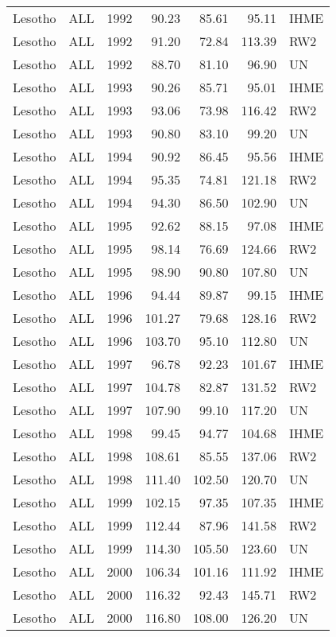 \begin{longtable}{lllrrrl}
  Lesotho & ALL & 1992 & 90.23 & 85.61 & 95.11 & IHME \\ 
  Lesotho & ALL & 1992 & 91.20 & 72.84 & 113.39 & RW2 \\ 
  Lesotho & ALL & 1992 & 88.70 & 81.10 & 96.90 & UN \\ 
  Lesotho & ALL & 1993 & 90.26 & 85.71 & 95.01 & IHME \\ 
  Lesotho & ALL & 1993 & 93.06 & 73.98 & 116.42 & RW2 \\ 
  Lesotho & ALL & 1993 & 90.80 & 83.10 & 99.20 & UN \\ 
  Lesotho & ALL & 1994 & 90.92 & 86.45 & 95.56 & IHME \\ 
  Lesotho & ALL & 1994 & 95.35 & 74.81 & 121.18 & RW2 \\ 
  Lesotho & ALL & 1994 & 94.30 & 86.50 & 102.90 & UN \\ 
  Lesotho & ALL & 1995 & 92.62 & 88.15 & 97.08 & IHME \\ 
  Lesotho & ALL & 1995 & 98.14 & 76.69 & 124.66 & RW2 \\ 
  Lesotho & ALL & 1995 & 98.90 & 90.80 & 107.80 & UN \\ 
  Lesotho & ALL & 1996 & 94.44 & 89.87 & 99.15 & IHME \\ 
  Lesotho & ALL & 1996 & 101.27 & 79.68 & 128.16 & RW2 \\ 
  Lesotho & ALL & 1996 & 103.70 & 95.10 & 112.80 & UN \\ 
  Lesotho & ALL & 1997 & 96.78 & 92.23 & 101.67 & IHME \\ 
  Lesotho & ALL & 1997 & 104.78 & 82.87 & 131.52 & RW2 \\ 
  Lesotho & ALL & 1997 & 107.90 & 99.10 & 117.20 & UN \\ 
  Lesotho & ALL & 1998 & 99.45 & 94.77 & 104.68 & IHME \\ 
  Lesotho & ALL & 1998 & 108.61 & 85.55 & 137.06 & RW2 \\ 
  Lesotho & ALL & 1998 & 111.40 & 102.50 & 120.70 & UN \\ 
  Lesotho & ALL & 1999 & 102.15 & 97.35 & 107.35 & IHME \\ 
  Lesotho & ALL & 1999 & 112.44 & 87.96 & 141.58 & RW2 \\ 
  Lesotho & ALL & 1999 & 114.30 & 105.50 & 123.60 & UN \\ 
  Lesotho & ALL & 2000 & 106.34 & 101.16 & 111.92 & IHME \\ 
  Lesotho & ALL & 2000 & 116.32 & 92.43 & 145.71 & RW2 \\ 
  Lesotho & ALL & 2000 & 116.80 & 108.00 & 126.20 & UN \\ 

\end{longtable}
